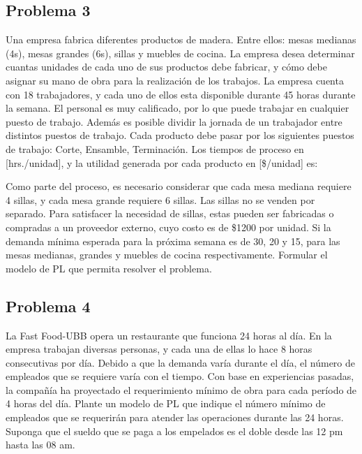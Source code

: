 \documentclass[letterpaper]{article}
\begin{document}
\subsection*{Problema 3}
Una empresa fabrica diferentes productos de madera. Entre ellos: mesas medianas (4s), mesas grandes (6s), sillas y muebles de cocina. La empresa desea determinar cuantas unidades de cada uno de sus productos debe fabricar, y cómo debe asignar su mano de obra para la realización de los trabajos. La empresa cuenta con 18 trabajadores, y cada uno de ellos esta disponible durante 45 horas durante la
semana. El personal es muy calificado, por lo que puede trabajar en cualquier puesto de trabajo. Además es posible dividir la jornada de un trabajador entre distintos puestos de trabajo. Cada producto debe pasar por los siguientes puestos de trabajo: Corte, Ensamble, Terminación. Los tiempos de proceso en [hrs./unidad], y la utilidad generada por cada producto en [\$/unidad] es:



Como parte del proceso, es necesario considerar que cada mesa mediana requiere 4 sillas, y cada mesa grande requiere 6 sillas. Las sillas no se venden por separado. Para satisfacer la necesidad de sillas, estas pueden ser fabricadas o compradas a un proveedor externo, cuyo costo es de \$1200 por unidad. Si la demanda mínima esperada para la próxima semana es de 30, 20 y 15, para las mesas medianas, grandes y muebles de cocina respectivamente. Formular el modelo de PL que permita resolver el problema.

\subsection*{Problema 4}
La Fast Food-UBB opera un restaurante que funciona 24 horas al día. En la empresa trabajan diversas personas, y cada una de ellas lo hace 8 horas consecutivas por día. Debido a que la demanda varía durante el día, el número de empleados que se requiere varía con el tiempo. Con base en experiencias pasadas, la compañía ha proyectado el requerimiento mínimo de obra para cada período de 4 horas del día. Plante un modelo de PL que indique el número mínimo de empleados que se requerirán para atender las operaciones durante las 24 horas. Suponga que el sueldo que se paga a los empelados es el doble desde las 12 pm hasta las 08 am.


\end{document}
